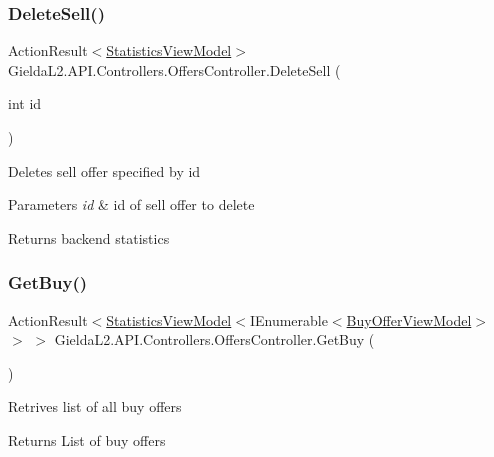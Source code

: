 \subsubsection{\texorpdfstring{DeleteSell()}{DeleteSell()}}
{\footnotesize\ttfamily Action\+Result$<$\mbox{\hyperlink{class_gielda_l2_1_1_a_p_i_1_1_view_models_1_1_view_1_1_statistics_view_model}{Statistics\+View\+Model}}$>$ Gielda\+L2.\+A\+P\+I.\+Controllers.\+Offers\+Controller.\+Delete\+Sell (\begin{DoxyParamCaption}\item[{int}]{id }\end{DoxyParamCaption})}



Deletes sell offer specified by id 


\begin{DoxyParams}{Parameters}
{\em id} & id of sell offer to delete\\
\hline
\end{DoxyParams}
\begin{DoxyReturn}{Returns}
backend statistics
\end{DoxyReturn}
\mbox{\label{class_gielda_l2_1_1_a_p_i_1_1_controllers_1_1_offers_controller_a0c19e9a3ee9a48231d20f52d57048c22}} 
\subsubsection{\texorpdfstring{GetBuy()}{GetBuy()}\hspace{0.1cm}{\footnotesize\ttfamily [1/2]}}
{\footnotesize\ttfamily Action\+Result$<$\mbox{\hyperlink{class_gielda_l2_1_1_a_p_i_1_1_view_models_1_1_view_1_1_statistics_view_model}{Statistics\+View\+Model}}$<$I\+Enumerable$<$\mbox{\hyperlink{class_gielda_l2_1_1_a_p_i_1_1_view_models_1_1_view_1_1_buy_offer_view_model}{Buy\+Offer\+View\+Model}}$>$ $>$ $>$ Gielda\+L2.\+A\+P\+I.\+Controllers.\+Offers\+Controller.\+Get\+Buy (\begin{DoxyParamCaption}{ }\end{DoxyParamCaption})}



Retrives list of all buy offers 

\begin{DoxyReturn}{Returns}
List of buy offers
\end{DoxyReturn}
\mbox{\label{class_gielda_l2_1_1_a_p_i_1_1_controllers_1_1_offers_controller_a1310ed7960becb921d6b9285ae375c95}} 
